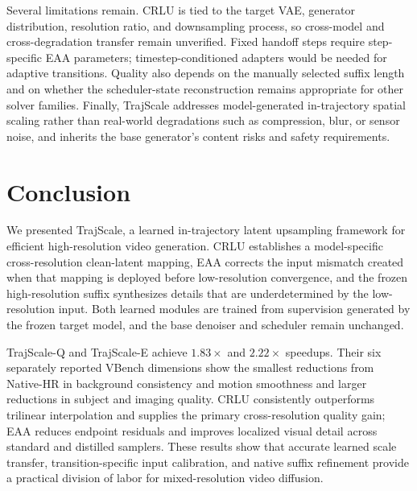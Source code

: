 Several limitations remain. CRLU is tied to the target VAE, generator
distribution, resolution ratio, and downsampling process, so cross-model and
cross-degradation transfer remain unverified. Fixed handoff steps require
step-specific EAA parameters; timestep-conditioned adapters would be needed for
adaptive transitions. Quality also depends on the manually selected suffix
length and on whether the scheduler-state reconstruction remains appropriate
for other solver families. Finally, TrajScale addresses model-generated
in-trajectory spatial scaling rather than real-world degradations such as
compression, blur, or sensor noise, and inherits the base generator's content
risks and safety requirements.

\section{Conclusion}

We presented TrajScale, a learned in-trajectory latent upsampling framework for
efficient high-resolution video generation. CRLU establishes a model-specific
cross-resolution clean-latent mapping, EAA corrects the input mismatch created
when that mapping is deployed before low-resolution convergence, and the
frozen high-resolution suffix synthesizes details that are underdetermined by
the low-resolution input. Both learned modules are trained from supervision
generated by the frozen target model, and the base denoiser and scheduler remain
unchanged.

TrajScale-Q and TrajScale-E achieve \(1.83\times\) and \(2.22\times\) speedups.
Their six separately reported VBench dimensions show the smallest reductions
from Native-HR in background consistency and motion smoothness and larger
reductions in subject and imaging quality. CRLU consistently outperforms
trilinear interpolation and supplies the primary
cross-resolution quality gain; EAA reduces endpoint residuals and improves
localized visual detail across standard and distilled samplers. These results
show that accurate learned scale transfer, transition-specific input
calibration, and native suffix refinement provide a practical division of labor
for mixed-resolution video diffusion.
